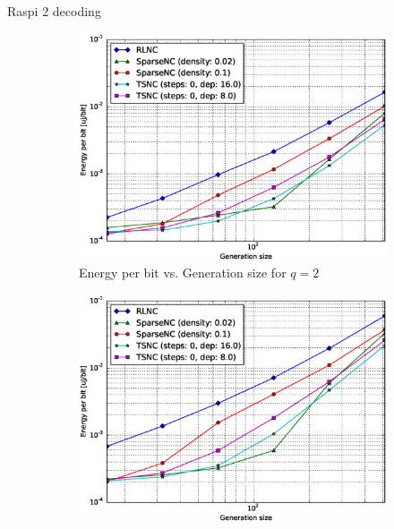 Raspi 2 decoding

\begin{figure}
    \centering
    \begin{subfigure}[b]{0.475\textwidth}
        \centering
        \includegraphics[width=1.1\textwidth]{images/23_07_2015/energy_per_bit_vs_generation_size_Rasp_v2_Binary_decoder_1600.eps}
        \caption[]%
        {{\small Energy per bit vs. Generation size for $q = 2$}}
        \label{fig:dec_ene_rasp2_gen_gf2}
    \end{subfigure}
    \hfill
    \begin{subfigure}[b]{0.475\textwidth}
        \centering
        \includegraphics[width=1.1\textwidth]{images/23_07_2015/energy_per_bit_vs_generation_size_Rasp_v2_Binary8_decoder_1600.eps}

\end{subfigure}
\end{figure}
